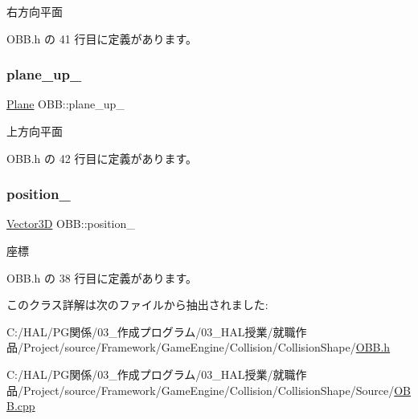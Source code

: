 右方向平面 



 O\+B\+B.\+h の 41 行目に定義があります。

\mbox{\label{class_o_b_b_a0105639f79e695f0510b2b097df78b18}} 
\subsubsection{\texorpdfstring{plane\+\_\+up\+\_\+}{plane\_up\_}}
{\footnotesize\ttfamily \mbox{\hyperlink{class_plane}{Plane}} O\+B\+B\+::plane\+\_\+up\+\_\+\hspace{0.3cm}{\ttfamily [private]}}



上方向平面 



 O\+B\+B.\+h の 42 行目に定義があります。

\mbox{\label{class_o_b_b_ab05a884fc030d7a3cf7b355880d9194c}} 
\subsubsection{\texorpdfstring{position\+\_\+}{position\_}}
{\footnotesize\ttfamily \mbox{\hyperlink{class_vector3_d}{Vector3D}} O\+B\+B\+::position\+\_\+\hspace{0.3cm}{\ttfamily [private]}}



座標 



 O\+B\+B.\+h の 38 行目に定義があります。



このクラス詳解は次のファイルから抽出されました\+:\begin{DoxyCompactItemize}
\item 
C\+:/\+H\+A\+L/\+P\+G関係/03\+\_\+作成プログラム/03\+\_\+\+H\+A\+L授業/就職作品/\+Project/source/\+Framework/\+Game\+Engine/\+Collision/\+Collision\+Shape/\mbox{\hyperlink{_o_b_b_8h}{O\+B\+B.\+h}}\item 
C\+:/\+H\+A\+L/\+P\+G関係/03\+\_\+作成プログラム/03\+\_\+\+H\+A\+L授業/就職作品/\+Project/source/\+Framework/\+Game\+Engine/\+Collision/\+Collision\+Shape/\+Source/\mbox{\hyperlink{_o_b_b_8cpp}{O\+B\+B.\+cpp}}\end{DoxyCompactItemize}

